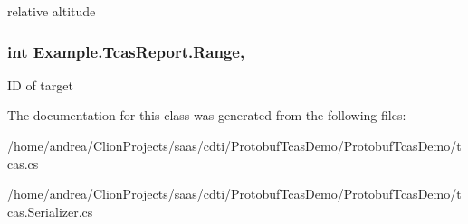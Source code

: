 relative altitude

\subsubsection[{\texorpdfstring{Range}{Range}}]{\setlength{\rightskip}{0pt plus 5cm}int Example.\+Tcas\+Report.\+Range\hspace{0.3cm}{\ttfamily [get]}, {\ttfamily [set]}}\hypertarget{class_example_1_1_tcas_report_a32691ce0bb3b627f44655cf3013f5f20}{}\label{class_example_1_1_tcas_report_a32691ce0bb3b627f44655cf3013f5f20}


ID of target



The documentation for this class was generated from the following files\+:\begin{DoxyCompactItemize}
\item 
/home/andrea/\+Clion\+Projects/saas/cdti/\+Protobuf\+Tcas\+Demo/\+Protobuf\+Tcas\+Demo/tcas.\+cs\item 
/home/andrea/\+Clion\+Projects/saas/cdti/\+Protobuf\+Tcas\+Demo/\+Protobuf\+Tcas\+Demo/tcas.\+Serializer.\+cs\end{DoxyCompactItemize}

